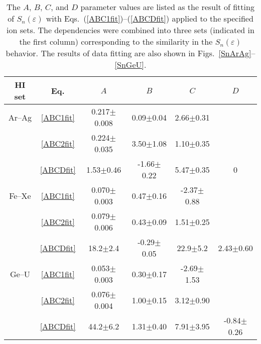 \documentclass[aps,pra,twocolumn,amsmath,amssymb,floatfix]{revtex4-2}
\begin{document}
\begin{table}[!h]  %
\caption{\label{SnABCDfit} The $A$, $B$, $C$, and $D$ parameter values are listed as the result of fitting of $S_{n}(\varepsilon)$ with Eqs.~(\ref{ABC1fit})--(\ref{ABCDfit}) applied to the specified ion sets. The dependencies were combined into three sets (indicated in the first column) corresponding to the similarity in the $S_{n}(\varepsilon)$ behavior. The results of data fitting are also shown in Figs.~\ref{SnArAg}--\ref{SnGeU}.
}
\begin{ruledtabular}
\begin{tabular}{cccccc}
HI set    &     Eq.                &               $A$               &                $B$          &                  $C$             &           $D$                  \\
\hline
  Ar--Ag & \ref{ABC1fit} & 0.217$\pm$0.008 &  0.09$\pm$0.04  & 2.66$\pm$0.31       &                                      \\
                & \ref{ABC2fit} & 0.224$\pm$0.035 &   3.50$\pm$1.08 & 1.10$\pm$0.35       &                                      \\
                & \ref{ABCDfit} &   1.53$\pm$0.46    & -1.66$\pm$0.22  & 5.47$\pm$0.35      & 0\footnotemark[1] \\
  Fe--Xe & \ref{ABC1fit}  & 0.070$\pm$0.003 &   0.47$\pm$0.16  & -2.37$\pm$0.88    &                                      \\
               & \ref{ABC2fit} & 0.079$\pm$0.006 &  0.43$\pm$0.09    & 1.51$\pm$0.25      &                                      \\
               & \ref{ABCDfit} &  18.2$\pm$2.4       & -0.29$\pm$0.05    &  22.9$\pm$5.2       &   2.43$\pm$0.60     \\
  Ge--U  & \ref{ABC1fit} & 0.053$\pm$0.003 &   0.30$\pm$0.17    & -2.69$\pm$1.53    &                                      \\
               & \ref{ABC2fit} & 0.076$\pm$0.004 &   1.00$\pm$0.15    &  3.12$\pm$0.90     &                                      \\
               & \ref{ABCDfit} &  44.2$\pm$6.2       &   1.31$\pm$0.40    &  7.91$\pm$3.95     &   -0.84$\pm$0.26   \\
\end{tabular}
\end{ruledtabular}
\end{table}
\end{document}
